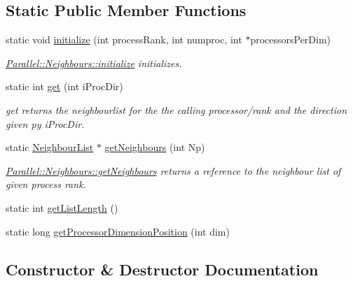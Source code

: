 \subsection*{Static Public Member Functions}
\begin{DoxyCompactItemize}
\item 
static void \mbox{\hyperlink{class_parallel_1_1_neighbours_a59e68da5867bfa27a867ed0b443267d7}{initialize}} (int process\+Rank, int numproc, int $\ast$processors\+Per\+Dim)
\begin{DoxyCompactList}\small\item\em \mbox{\hyperlink{class_parallel_1_1_neighbours_a59e68da5867bfa27a867ed0b443267d7}{Parallel\+::\+Neighbours\+::initialize}} initializes. \end{DoxyCompactList}\item 
static int \mbox{\hyperlink{class_parallel_1_1_neighbours_a84653f3e22436280ac5a4689a24e7146}{get}} (int i\+Proc\+Dir)
\begin{DoxyCompactList}\small\item\em get returns the neighbourlist for the the calling processor/rank and the direction given py i\+Proc\+Dir. \end{DoxyCompactList}\item 
static \mbox{\hyperlink{struct_neighbour_list}{Neighbour\+List}} $\ast$ \mbox{\hyperlink{class_parallel_1_1_neighbours_aa3e776b78a708f2c4ce9f287b81f263e}{get\+Neighbours}} (int Np)
\begin{DoxyCompactList}\small\item\em \mbox{\hyperlink{class_parallel_1_1_neighbours_aa3e776b78a708f2c4ce9f287b81f263e}{Parallel\+::\+Neighbours\+::get\+Neighbours}} returns a reference to the neighbour list of given process rank. \end{DoxyCompactList}\item 
static int \mbox{\hyperlink{class_parallel_1_1_neighbours_aadbdf345a7b541bd6705bddac1969961}{get\+List\+Length}} ()
\item 
static long \mbox{\hyperlink{class_parallel_1_1_neighbours_ad1a2a616b4089eded3545faf11409b85}{get\+Processor\+Dimension\+Position}} (int dim)
\end{DoxyCompactItemize}


\subsection{Constructor \& Destructor Documentation}
\mbox{\label{class_parallel_1_1_neighbours_a2bf11efc3bb079e65e9126c7a10d0097}} 
